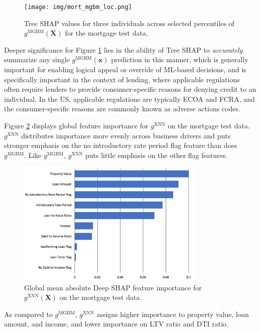 \documentclass[information,article,submit,moreauthors,pdftex]{definitions/mdpi}
\begin{document}
\begin{figure}[H]
\centering
\texttt{[image: img/mort\_mgbm\_loc.png]}
\caption{Tree SHAP values for three individuals across selected percentiles of $g^\text{MGBM}(\mathbf{X})$ for the mortgage test data.}
\label{fig:mort_mgbm_loc}
\end{figure}   

\noindent Deeper significance for Figure \ref{fig:mort_mgbm_loc} lies in the ability of Tree SHAP to \textit{accurately} summarize any single $g^\text{MGBM}(\mathbf{x})$ prediction in this manner, which is generally important for enabling logical appeal or override of ML-based decisions, and is specifically important in the context of lending, where applicable regulations often require lenders to provide consumer-specific reasons for denying credit to an individual. In the US, applicable regulations are typically ECOA and FCRA, and the consumer-specific reasons are commonly known as adverse actions codes.

Figure \ref{fig:mort_xnn_glob} displays global feature importance for $g^\text{XNN}$ on the mortgage test data. $g^\text{XNN}$ distributes importance more evenly across business drivers and puts stronger emphasis on the no introductory rate period flag feature than does $g^\text{MGBM}$. Like $g^\text{MGBM}$, $g^\text{XNN}$ puts little emphasis on the other flag features.  

\begin{figure}[H]
\centering
\includegraphics[width=9cm]{img/mort_xnn_glob.png}
\caption{Global mean absolute Deep SHAP feature importance for $g^\text{XNN}(\mathbf{X})$ on the mortgage test data.}
\label{fig:mort_xnn_glob}
\end{figure} 

\noindent As compared to $g^\text{MGBM}$, $g^\text{XNN}$ assigns higher importance to property value, loan amount, and income, and lower importance on LTV ratio and DTI ratio. 
\end{document}
